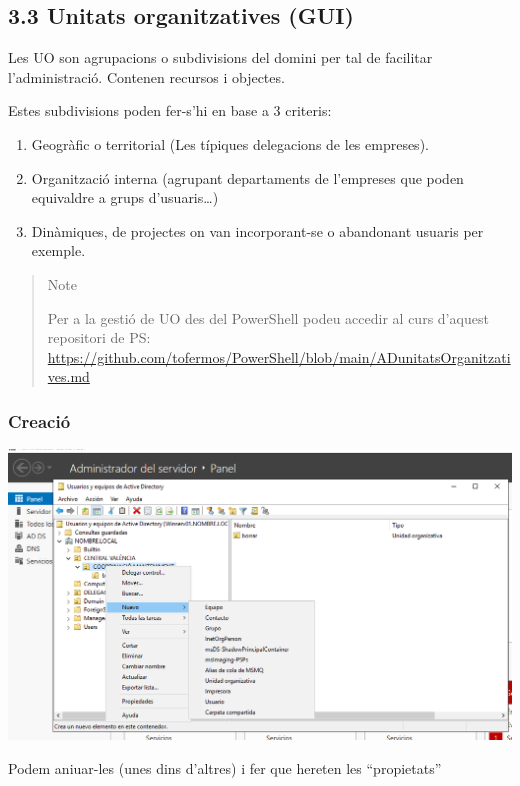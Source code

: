 \documentclass[
  a4paper,
]{article}
\begin{document}
\subsection{3.3 Unitats organitzatives
(GUI)}\label{unitats-organitzatives-gui}

Les UO son agrupacions o subdivisions del domini per tal de facilitar
l'administració. Contenen recursos i objectes.

Estes subdivisions poden fer-s'hi en base a 3 criteris:

\begin{enumerate}
\def\labelenumi{\arabic{enumi}.}
\item
  Geogràfic o territorial (Les típiques delegacions de les empreses).
\item
  Organització interna (agrupant departaments de l'empreses que poden
  equivaldre a grups d'usuaris\ldots)
\item
  Dinàmiques, de projectes on van incorporant-se o abandonant usuaris
  per exemple.
\end{enumerate}

\begin{quote}
Note

Per a la gestió de UO des del PowerShell podeu accedir al curs d'aquest
repositori de PS:
\url{https://github.com/tofermos/PowerShell/blob/main/ADunitatsOrganitzatives.md}
\end{quote}

\subsubsection{Creació}\label{creaciuxf3}

\includegraphics{png/UO1.png}

Podem aniuar-les (unes dins d'altres) i fer que hereten les
``propietats''
\end{document}
